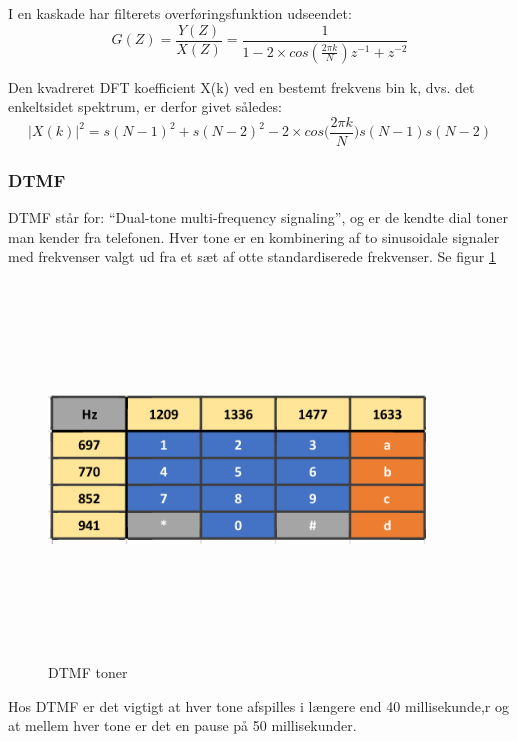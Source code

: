 I en kaskade har filterets overføringsfunktion udseendet:
\begin{equation}
G(Z) = \frac{Y(Z)}{X(Z)} = \frac{1}{1-2 \times cos(\frac{2 \pi k}{N})z^{-1}+z^{-2}} \label{eq:of}
\end{equation}

Den kvadreret DFT koefficient X(k) ved en bestemt frekvens bin k, dvs. det enkeltsidet spektrum, er derfor givet således:
\begin{equation}
|X(k)|^2 = s(N - 1)^2 + s(N-2)^2 - 2 \times cos \bigg(\frac{2 \pi k}{N} \bigg) s(N-1) s(N-2) \label{eq:DTF}
\end{equation}

\subsubsection{DTMF}
DTMF står for: “Dual-tone multi-frequency signaling”, og er de kendte dial toner man kender fra telefonen. Hver tone er en kombinering af to sinusoidale signaler med frekvenser valgt ud fra et sæt af otte standardiserede frekvenser. Se figur \ref{fig:dtmf}
\begin{figure}[ht]
	\centering
	\includegraphics[width=10cm,height=10cm,keepaspectratio]{pictures/DTMF.png}
	\caption{DTMF toner}
	\label{fig:dtmf}
\end{figure}
\newline
Hos DTMF er det vigtigt at hver tone afspilles i længere end 40 millisekunde,r og at mellem hver tone er det en pause på 50 millisekunder.

